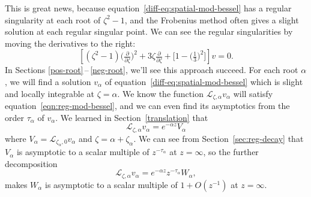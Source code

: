 \documentclass{article}
\newcommand{\fracderiv}[3]{\partial^{#1}_{#2, #3}}
\newcommand{\laplace}{\mathcal{L}}
\theoremstyle{definition}
\theoremstyle{plain}
\begin{document}
This is great news, because equation~\eqref{diff-eq:spatial-mod-bessel} has a regular singularity at each root of $\zeta^2 - 1$, and the Frobenius method often gives a slight solution at each regular singular point. We can see the regular singularities by moving the derivatives to the right:
\[ \left[ (\zeta^2 - 1) \big(\tfrac{\partial}{\partial \zeta}\big)^2 + 3\zeta \tfrac{\partial}{\partial \zeta} + \big[ 1 - \big(\tfrac{1}{3}\big)^2 \big] \right] v = 0. \]
In Sections \ref{pos-root}\,--\,\ref{neg-root}, we’ll see this approach succeed. For each root $\alpha$, we will find a solution $v_\alpha$ of equation~\eqref{diff-eq:spatial-mod-bessel} which is slight and locally integrable at $\zeta = \alpha$. We know the function $\laplace_{\zeta, \alpha} v_\alpha$ will satisfy equation~\eqref{eqn:reg-mod-bessel}, and we can even find its asymptotics from the order $\tau_\alpha$ of $v_\alpha$. We learned in Section~\ref{translation} that
\[ \laplace_{\zeta, \alpha} v_\alpha = e^{-\alpha z} V_\alpha \]
where $V_\alpha = \laplace_{\zeta_\alpha, 0} v_\alpha$ and $\zeta = \alpha + \zeta_\alpha$. We can see from Section~\ref{sec:reg-decay} that $V_\alpha$ is asymptotic to a scalar multiple of $z^{ - \tau_\alpha}$ at $z = \infty$, so the further decomposition
\[ \laplace_{\zeta, \alpha} v_\alpha = e^{-\alpha z} z^{-\tau_\alpha} W_\alpha, \]
makes $W_\alpha$ is asymptotic to a scalar multiple of $1+O(z^{-1})$ at $z = \infty$.
\end{document}

